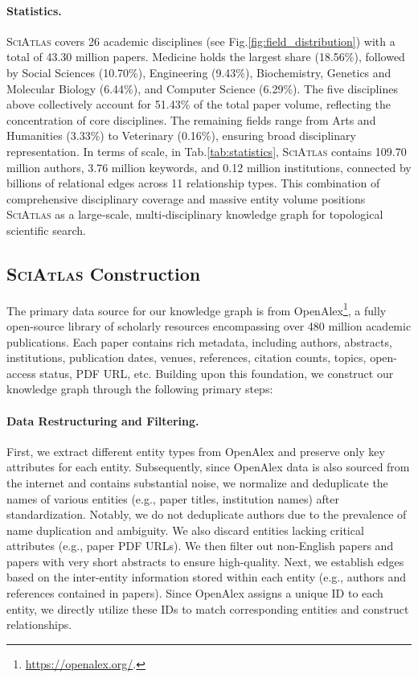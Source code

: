 \documentclass{llmxive}
\providecommand{\ours}{\textsc{SciAtlas}}
\begin{document}
\paragraph{Statistics.}
{\ours} covers 26 academic disciplines (see Fig.\ref{fig:field_distribution}) with a total of 43.30 million papers.
Medicine holds the largest share (18.56\%), followed by Social Sciences (10.70\%), Engineering (9.43\%), Biochemistry, Genetics and Molecular Biology (6.44\%), and Computer Science (6.29\%).
The five disciplines above collectively account for 51.43\% of the total paper volume, reflecting the concentration of core disciplines.
The remaining fields range from Arts and Humanities (3.33\%) to Veterinary (0.16\%), ensuring broad disciplinary representation.
In terms of scale, in Tab.\ref{tab:statistics}, {\ours} contains 109.70 million authors, 3.76 million keywords, and 0.12 million institutions, connected by billions of relational edges across 11 relationship types.
This combination of comprehensive disciplinary coverage and massive entity volume positions {\ours} as a large‑scale, multi‑disciplinary knowledge graph for topological scientific search.

\subsection{{\ours} Construction}
\label{sec:construction}

The primary data source for our knowledge graph is from OpenAlex\footnote{\url{https://openalex.org/}.}, a fully open-source library of scholarly resources encompassing over 480 million academic publications.
Each paper contains rich metadata, including authors, abstracts, institutions, publication dates, venues, references, citation counts, topics, open-access status, PDF URL, etc.
Building upon this foundation, we construct our knowledge graph through the following primary steps:

\paragraph{Data Restructuring and Filtering.}
First, we extract different entity types from OpenAlex and preserve only key attributes for each entity.
Subsequently, since OpenAlex data is also sourced from the internet and contains substantial noise, we normalize and deduplicate the names of various entities (e.g., paper titles, institution names) after standardization.
Notably, we do not deduplicate authors due to the prevalence of name duplication and ambiguity.
We also discard entities lacking critical attributes (e.g., paper PDF URLs).
We then filter out non-English papers and papers with very short abstracts to ensure high-quality.
Next, we establish edges based on the inter-entity information stored within each entity (e.g., authors and references contained in papers).
Since OpenAlex assigns a unique ID to each entity, we directly utilize these IDs to match corresponding entities and construct relationships.
\end{document}
